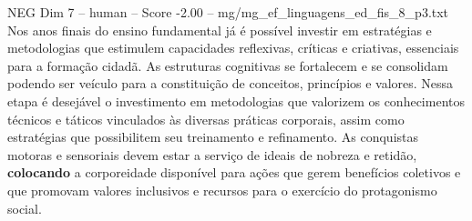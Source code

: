 \begin{textsample}{NEG Dim 7 – human – Score -2.00 – mg/mg\_ef\_linguagens\_ed\_fis\_8\_p3.txt}  \label{ex:f7_neg_018}
Nos anos finais do ensino fundamental já é possível investir em estratégias e metodologias que estimulem capacidades reflexivas, críticas e criativas, essenciais para a formação cidadã.
As estruturas cognitivas se fortalecem e se consolidam podendo ser veículo para a constituição de conceitos, princípios e valores.
Nessa etapa é desejável o investimento em metodologias que valorizem os conhecimentos técnicos e táticos vinculados às diversas práticas corporais, assim como estratégias que possibilitem seu treinamento e refinamento.
As conquistas motoras e sensoriais devem estar a serviço de ideais de nobreza e retidão, \textbf{colocando} a corporeidade disponível para ações que gerem benefícios coletivos e que promovam valores inclusivos e recursos para o exercício do protagonismo social.

\end{textsample}
